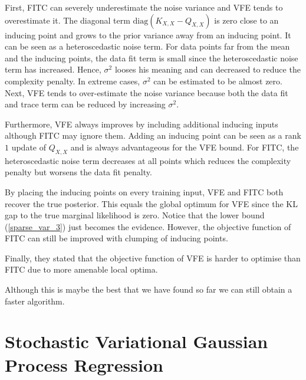 \documentclass[12pt,a4paper,oneside]{book}
\begin{document}
First, FITC can severely underestimate the noise variance and VFE tends to overestimate it. The diagonal term $\text{diag}( K_{X,X} - Q_{X,X})$ is zero close to an inducing point and grows to the prior variance away from an inducing point. It can be seen as a heteroscedastic noise term. For data points far from the mean and the inducing points, the data fit term is small since the heteroscedastic noise term has increased. Hence, $\sigma^2$ looses his meaning and can decreased to reduce the complexity penalty. In extreme cases, $\sigma^2$ can be estimated to be almost zero. Next, VFE tends to over-estimate the noise variance because both the data fit and trace term can be reduced by increasing $\sigma^2$.

Furthermore, VFE always improves by including additional inducing inputs although FITC may ignore them. Adding an inducing point can be seen as a rank $1$ update of $Q_{X,X}$ and is always advantageous for the VFE bound. For FITC, the heteroscedastic noise term decreases at all points which reduces the complexity penalty but worsens the data fit penalty.

By placing the inducing points on every training input, VFE and FITC both recover the true posterior. This equals the global optimum for VFE since the KL gap to the true marginal likelihood is zero.  Notice that the lower bound (\ref{sparse_var_3}) just becomes the evidence. However, the objective function of FITC can still be improved with clumping of inducing points. 

Finally, they stated that the objective function of VFE is harder to optimise than FITC due to more amenable local optima. 

Although this is maybe the best that we have found so far we can still obtain a faster algorithm. 

\section{Stochastic Variational Gaussian Process Regression}
\end{document}
